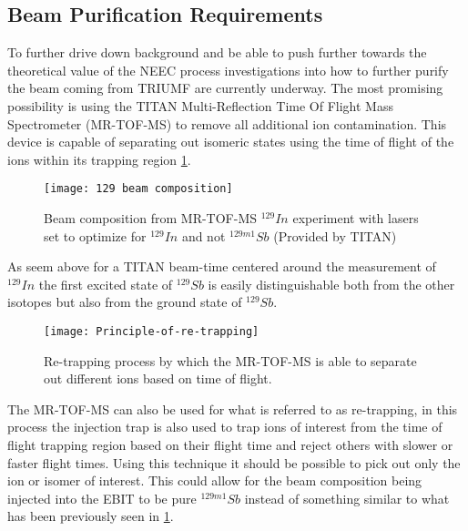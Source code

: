 \documentclass[jon_ringuette_thesis_proposal.tex]{subfiles}
\begin{document}

    \subsection{Beam Purification Requirements}
    To further drive down background and be able to push further towards the theoretical value of the NEEC process investigations into how to further purify the beam coming from TRIUMF are currently underway.
    The most promising possibility is using the TITAN Multi-Reflection Time Of Flight Mass Spectrometer (MR-TOF-MS) to remove all additional ion contamination.
    This device is capable of separating out isomeric states using the time of flight of the ions within its trapping region \ref{fig:sb129_mrtof_beam_composition}.

    \begin{figure}[H]
        \begin{center}
            \texttt{[image: 129 beam composition]}
        \end{center}
        \caption{\small Beam composition from MR-TOF-MS $^{129}In$ experiment with lasers set to optimize for $^{129}In$ and not $^{129m1}Sb$ (Provided by TITAN)}
        \label{fig:sb129_mrtof_beam_composition}
    \end{figure}

    As seem above for a TITAN beam-time centered around the measurement of $^{129}In$ the first excited state of $^{129}Sb$ is easily distinguishable both from the other isotopes but also from the ground state of $^{129}Sb$.


    \begin{figure}[H]
        \begin{center}
            \texttt{[image: Principle-of-re-trapping]}
        \end{center}
        \caption{\small Re-trapping process by which the MR-TOF-MS is able to separate out different ions based on time of flight. \cite{Excitation1865}}
        \label{fig:mrtof-retrapping_guide}
    \end{figure}

    The MR-TOF-MS can also be used for what is referred to as re-trapping, in this process the injection trap is also used to trap ions of interest from the time of flight trapping region based on their flight time and reject others with slower or faster flight times.
    Using this technique it should be possible to pick out only the ion or isomer of interest.
    This could allow for the beam composition being injected into the EBIT to be pure $^{129m1}Sb$ instead of something similar to what has been previously seen in \ref{fig:sb129_mrtof_beam_composition}.
\end{document}
